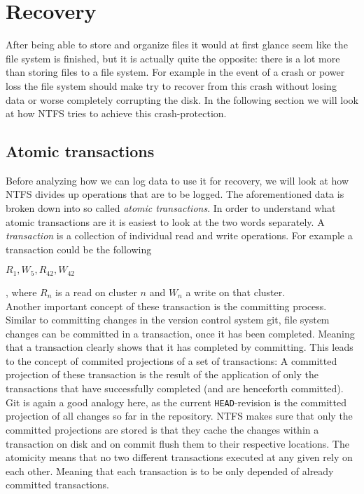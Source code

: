 \section{Recovery}
After being able to store and organize files it would at first glance seem like the file system is finished, but it is actually quite the opposite: there is a lot more than storing files to a file system. For example in the event of a crash or power loss the file system should make try to recover from this crash without losing data or worse completely corrupting the disk. In the following section we will look at how NTFS tries to achieve this crash-protection.
\subsection{Atomic transactions}
Before analyzing how we can log data to use it for recovery, we will look at how NTFS divides up operations that are to be logged. 
The aforementioned data is broken down into so called \textit{atomic transactions}. In order to understand what atomic transactions are it is easiest to look at the two words separately.
A \textit{transaction} is a collection of individual read and write operations. For example a transaction could be the following
\begin{center}
	\texttt{$ R_1, W_5, R_{42}, W_{42} $}
\end{center}
, where $R_n$  is a read on cluster $n$ and $W_n$ a write on that cluster.\\
Another important concept of these transaction is the committing process. Similar to committing changes in the version control system git, file system changes can be committed in a transaction, once it has been completed. Meaning that a transaction clearly shows that it has completed by committing. This leads to the concept of commited projections of a set of transactions: A committed projection of these transaction is the result of the application of only the transactions that have successfully completed (and are henceforth committed). Git is again a good analogy here, as the current \texttt{HEAD}-revision is the committed projection of all changes so far in the repository. NTFS makes sure  that only the committed projections are stored is that they cache the changes within a transaction on disk and on commit flush them to their respective locations.
The atomicity means that no two different transactions executed at any given rely on each other. Meaning that each transaction is to be only depended of already committed transactions.


